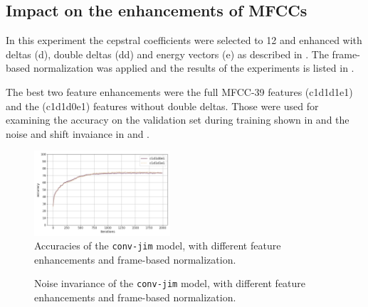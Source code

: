 \subsection{Impact on the enhancements of MFCCs}\label{sec:exp_fs_mfcc}
In this experiment the cepstral coefficients were selected to 12 and enhanced with deltas (d), double deltas (dd) and energy vectors (e) as described in .
The frame-based normalization was applied and the results of the experiments is listed in .

The best two feature enhancements were the full MFCC-39 features (c1d1d1e1) and the (c1d1d0e1) features without double deltas.
Those were used for examining the accuracy on the validation set during training shown in  and the noise and shift invaiance in  and .
\begin{figure}[!ht]
  \centering
  \includegraphics[width=0.45\textwidth]{./5_exp/figs/exp_fs_mfcc_acc_conv-jim}
  \caption{Accuracies of the \texttt{conv-jim} model, with different feature enhancements and frame-based normalization.}
  \label{fig:exp_fs_mfcc_tb_acc_conv-jim}
\end{figure}
\FloatBarrier
\noindent
\begin{figure}[!ht]
  \centering
  \caption{Noise invariance of the \texttt{conv-jim} model, with different feature enhancements and frame-based normalization.}
  \label{fig:exp_fs_mfcc_tb_noise_conv-jim}
\end{figure}
